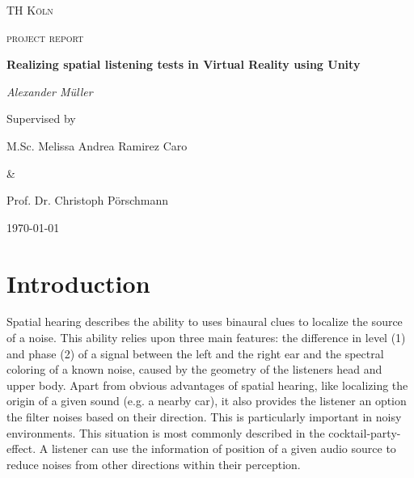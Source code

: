 \documentclass[a4paper,11pt]{article}%
\renewcommand{\\}{\vspace*{0.5\baselineskip} \newline}
\begin{document}

\begin{titlepage}
	\centering
	{\scshape\LARGE TH Köln \par}
	\vspace{1cm}
	{\scshape\Large project report\par}
	\vspace{1.5cm}
	{\huge\bfseries Realizing spatial listening tests in Virtual Reality using Unity\par}
	\vspace{2cm}
	{\Large\itshape Alexander Müller \par}
	\vfill
	Supervised by\par
	M.Sc. Melissa Andrea Ramirez Caro \par \&  \par Prof. Dr. Christoph Pörschmann
	\vfill

	{\large \today\par}
\end{titlepage}


\newpage

\tableofcontents
\newpage

\section{Introduction}
\label{sec:introduction}
Spatial hearing describes the ability to uses binaural clues to localize the source of a noise. This ability relies upon three main features: the difference in level (1) and phase (2) of a signal between the left and the right ear and the spectral coloring of a known noise, caused by the geometry of the listeners head and upper body.
\newline
\newline
Apart from obvious advantages of spatial hearing, like localizing the origin of a given sound (e.g. a nearby car), it also provides the listener an option the filter noises based on their direction. This is particularly important in noisy environments. This situation is most commonly described in the \dq cocktail-party-effect\dq{}. A listener can use the information of position of a given audio source to reduce noises from other directions within their perception.
\end{document}
